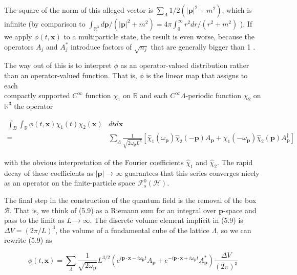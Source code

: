 \documentclass[10pt, letterpaper]{article}
\begin{document}
The square of the norm of this alleged vector is $\sum_{\Lambda} 1 / 2\left(|\mathbf{p}|^{2}+m^{2}\right)$, which is infinite (by comparison to $\int_{\mathbb{R}^{3}} d \mathbf{p} /\left(|\mathbf{p}|^{2}+m^{2}\right)=4 \pi \int_{0}^{\infty} r^{2} d r /\left(r^{2}+m^{2}\right)$ ). If we apply $\phi(t, \mathbf{x})$ to a multiparticle state, the result is even worse, because the operators $A_{j}$ and $A_{j}^{*}$ introduce factors of $\sqrt{n_{j}}$ that are generally bigger than 1 .

The way out of this is to interpret $\phi$ as an operator-valued distribution rather than an operator-valued function. That is, $\phi$ is the linear map that assigns to each\\
compactly supported $C^{\infty}$ function $\chi_{1}$ on $\mathbb{R}$ and each $C^{\infty} \Lambda$-periodic function $\chi_{2}$ on $\mathbb{R}^{3}$ the operator

$$
\begin{aligned}
\int_{B} \int_{\mathbb{R}} \phi(t, \mathbf{x}) \chi_{1}(t) \chi_{2}(\mathbf{x}) & d t d \mathbf{x} \\
= & \sum_{\Lambda} \frac{1}{\sqrt{2 \omega_{\mathbf{p}} L^{3}}}\left[\widehat{\chi}_{1}\left(\omega_{\mathbf{p}}\right) \widehat{\chi}_{2}(-\mathbf{p}) A_{\mathbf{p}}+\widehat{\chi}_{1}\left(-\omega_{\mathbf{p}}\right) \widehat{\chi}_{2}(\mathbf{p}) A_{\mathbf{p}}^{\dagger}\right]
\end{aligned}
$$

with the obvious interpretation of the Fourier coefficients $\widehat{\chi}_{1}$ and $\widehat{\chi}_{2}$. The rapid decay of these coefficients as $|\mathbf{p}| \rightarrow \infty$ guarantees that this series converges nicely as an operator on the finite-particle space $\mathcal{F}_{s}^{0}(\mathcal{H})$.

The final step in the construction of the quantum field is the removal of the box $\mathcal{B}$. That is, we think of (5.9) as a Riemann sum for an integral over $\mathbf{p}$-space and pass to the limit as $L \rightarrow \infty$. The discrete volume element implicit in (5.9) is $\Delta V=(2 \pi / L)^{3}$, the volume of a fundamental cube of the lattice $\Lambda$, so we can rewrite (5.9) as

$$
\phi(t, \mathbf{x})=\sum_{\Lambda} \frac{1}{\sqrt{2 \omega_{\mathbf{p}}}} L^{3 / 2}\left(e^{i \mathbf{p} \cdot \mathbf{x}-i \omega_{\mathbf{p}} t} A_{\mathbf{p}}+e^{-i \mathbf{p} \cdot \mathbf{x}+i \omega_{\mathbf{p}} t} A_{\mathbf{p}}^{*}\right) \frac{\Delta V}{(2 \pi)^{3}}
$$
\end{document}
